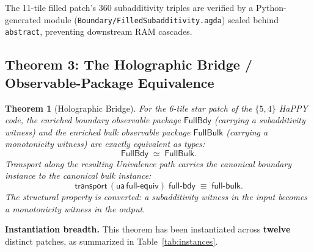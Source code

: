 \documentclass[11pt, a4paper]{article}
\theoremstyle{plain}
\newtheorem{theorem}{Theorem}[section]
\theoremstyle{definition}
\newcommand{\ua}{\mathsf{ua}}
\newcommand{\transport}{\mathsf{transport}}
\begin{document}
The 11-tile filled patch's 360 subadditivity triples are verified
by a Python-generated module
(\texttt{Boundary/FilledSubadditivity.agda}) sealed behind
\texttt{abstract}, preventing downstream RAM cascades.

\subsection{Theorem 3: The Holographic Bridge / Observable-Package Equivalence}
\label{sec:thm3}

\begin{theorem}[Holographic Bridge]
For the 6-tile star patch of the $\{5,4\}$ HaPPY code, the
enriched boundary observable package $\mathsf{FullBdy}$ (carrying
a subadditivity witness) and the enriched bulk observable package
$\mathsf{FullBulk}$ (carrying a monotonicity witness) are exactly
equivalent as types:
\[
  \mathsf{FullBdy} \;\simeq\; \mathsf{FullBulk}.
\]
Transport along the resulting Univalence path carries the canonical
boundary instance to the canonical bulk instance:
\[
  \transport\,(\ua\,\mathsf{full\text{-}equiv})\;
  \mathsf{full\text{-}bdy} \;\equiv\; \mathsf{full\text{-}bulk}.
\]
The structural property is converted: a subadditivity witness in
the input becomes a monotonicity witness in the output.
\end{theorem}

\noindent
\textbf{Instantiation breadth.}
This theorem has been instantiated across \textbf{twelve} distinct
patches, as summarized in Table~\ref{tab:instances}.
\end{document}
